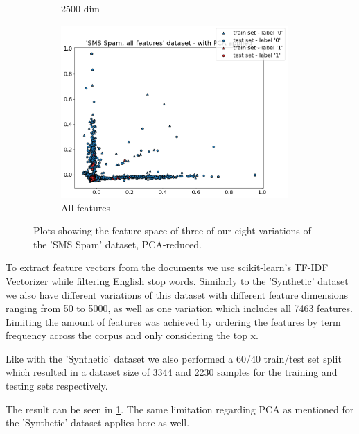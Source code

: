 \begin{figure}[h]
\begin{subfigure}[t]{0.32\textwidth}
        \caption{2500-dim}
    \end{subfigure}
    \begin{subfigure}[t]{0.32\textwidth}
        \centering
        \includegraphics[width=0.95\textwidth]{figures/'SMS Spam, all features' dataset - with PCA applied.png}
        \caption{All features}
    \end{subfigure}
    \caption{Plots showing the feature space of three of our eight variations of the 'SMS Spam' dataset, PCA-reduced.}
    \label{fig:sms_spam_plot}
\end{figure}

To extract feature vectors from the documents we use scikit-learn's TF-IDF Vectorizer while filtering English stop words. Similarly to the 'Synthetic' dataset we also have different variations of this dataset with different feature dimensions ranging from 50 to 5000, as well as one variation which includes all 7463 features. Limiting the amount of features was achieved by ordering the features by term frequency across the corpus and only considering the top x.

Like with the 'Synthetic' dataset we also performed a 60/40 train/test set split which resulted in a dataset size of 3344 and 2230 samples for the training and testing sets respectively.

The result can be seen in \ref{fig:sms_spam_plot}. The same limitation regarding PCA as mentioned for the 'Synthetic' dataset applies here as well.
